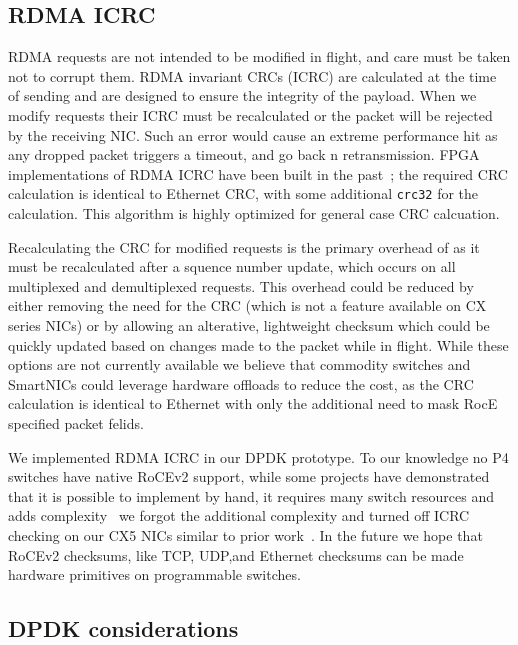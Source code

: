 \subsection{RDMA ICRC}

RDMA requests are not intended to be modified in flight, and care must
be taken not to corrupt them. RDMA invariant CRCs (ICRC) are
calculated at the time of sending and are designed to ensure the
integrity of the payload. When we modify requests their ICRC must be
recalculated or the packet will be rejected by the receiving NIC. Such
an error would cause an extreme performance hit as any dropped packet
triggers a timeout, and go back n retransmission.  FPGA
implementations of RDMA ICRC have been built in the
past~\cite{Mansour_2019}; the required CRC calculation is identical to
Ethernet CRC, with some additional \texttt{crc32} for the
calculation. This algorithm is highly optimized for general case CRC
calcuation.

Recalculating the CRC for modified requests is the primary overhead
of {\sword} as it must be recalculated after a squence number
update, which occurs on all multiplexed and demultiplexed
requests. This overhead could be reduced by either removing the need
for the CRC (which is not a feature available on CX series NICs) or by
allowing an alterative, lightweight checksum which could be quickly
updated based on changes made to the packet while in flight. While
these options are not currently available we believe that commodity
switches and SmartNICs could leverage hardware offloads to reduce the
cost, as the CRC calculation is identical to Ethernet with only the
additional need to mask RocE specified packet felids.

We implemented RDMA ICRC in our DPDK prototype. To our knowledge no P4 switches
have native RoCEv2 support, while some projects have demonstrated that it is
possible to implement by hand, it requires many switch resources and adds
complexity~\todo{~\cite{}} we forgot the additional complexity and turned off
ICRC checking on our CX5 NICs similar to prior work~\cite{switchml}. In the
future we hope that RoCEv2 checksums, like TCP, UDP,and Ethernet checksums can
be made hardware primitives on programmable switches.

\subsection{DPDK considerations}

